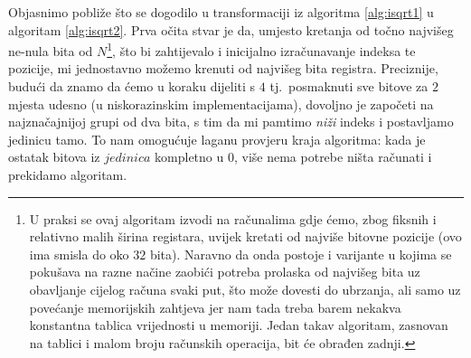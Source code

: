 \documentclass[12pt]{scrartcl}
\begin{document}
Objasnimo pobliže što se dogodilo u transformaciji iz algoritma \ref{alg:isqrt1} u algoritam \ref{alg:isqrt2}. Prva očita stvar je da, umjesto kretanja
od točno najvišeg ne-nula bita od $N$\footnote{U praksi se ovaj algoritam izvodi na računalima gdje ćemo, zbog fiksnih
i relativno malih širina registara, uvijek kretati od najviše bitovne pozicije (ovo ima smisla do oko $32$ bita).
Naravno da onda postoje i varijante u kojima se pokušava na razne načine
zaobići potreba prolaska od najvišeg bita uz obavljanje cijelog računa svaki put, što može dovesti do ubrzanja, ali samo uz povećanje
memorijskih zahtjeva jer nam tada treba barem nekakva konstantna tablica vrijednosti u memoriji.
Jedan takav algoritam, zasnovan na tablici i malom broju računskih operacija,
bit će obrađen zadnji.}, što bi zahtijevalo i inicijalno izračunavanje indeksa te pozicije, mi jednostavno možemo krenuti od najvišeg bita registra.
Preciznije, budući da znamo da ćemo u koraku dijeliti s $4$ tj.\ posmaknuti sve bitove za $2$ mjesta udesno (u niskorazinskim implementacijama), dovoljno
je započeti na najznačajnijoj grupi od dva bita, s tim da mi pamtimo \emph{niži} indeks i postavljamo jedinicu tamo.  To nam omogućuje laganu provjeru
kraja algoritma: kada je ostatak bitova iz $jedinica$ kompletno u $0$, više nema potrebe ništa računati i prekidamo algoritam.
\end{document}
